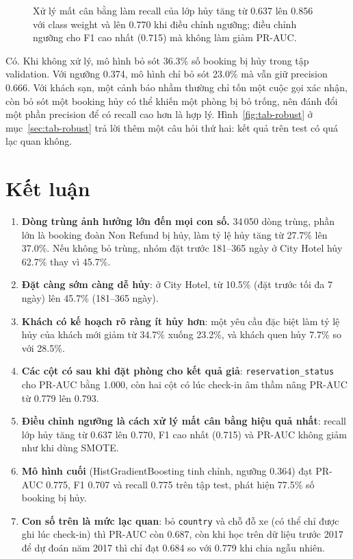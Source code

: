 \begin{figure}[H]
\centering
{}
\caption{Xử lý mất cân bằng làm recall của lớp hủy tăng từ 0.637 lên 0.856 với class weight và lên 0.770 khi điều chỉnh ngưỡng; điều chỉnh ngưỡng cho F1 cao nhất (0.715) mà không làm giảm PR-AUC.}
\label{fig:tab-creative}
\end{figure}

Có. Khi không xử lý, mô hình bỏ sót 36.3\% số booking bị hủy trong tập validation. Với ngưỡng 0.374, mô hình chỉ bỏ sót 23.0\%
mà vẫn giữ precision 0.666. Với khách sạn, một cảnh báo nhầm thường chỉ tốn một cuộc gọi xác nhận, còn bỏ sót một booking hủy
có thể khiến một phòng bị bỏ trống, nên đánh đổi một phần precision để có recall cao hơn là hợp lý.
Hình~\ref{fig:tab-robust} ở mục~\ref{sec:tab-robust} trả lời thêm một câu hỏi thứ hai: kết quả trên test có quá lạc quan không.

\section{Kết luận}
\begin{enumerate}[leftmargin=1.5cm]
    \item \textbf{Dòng trùng ảnh hưởng lớn đến mọi con số.} 34\,050 dòng trùng, phần lớn là booking đoàn Non Refund bị hủy,
          làm tỷ lệ hủy tăng từ 27.7\% lên 37.0\%. Nếu không bỏ trùng, nhóm đặt trước 181--365 ngày ở City Hotel hủy 62.7\% thay vì 45.7\%.
    \item \textbf{Đặt càng sớm càng dễ hủy}: ở City Hotel, từ 10.5\% (đặt trước tối đa 7 ngày) lên 45.7\% (181--365 ngày).
    \item \textbf{Khách có kế hoạch rõ ràng ít hủy hơn}: một yêu cầu đặc biệt làm tỷ lệ hủy của khách mới giảm từ 34.7\% xuống 23.2\%,
          và khách quen hủy 7.7\% so với 28.5\%.
    \item \textbf{Các cột có sau khi đặt phòng cho kết quả giả}: \texttt{reservation\_status} cho PR-AUC bằng 1.000,
          còn hai cột có lúc check-in âm thầm nâng PR-AUC từ 0.779 lên 0.793.
    \item \textbf{Điều chỉnh ngưỡng là cách xử lý mất cân bằng hiệu quả nhất}: recall lớp hủy tăng từ 0.637 lên 0.770,
          F1 cao nhất (0.715) và PR-AUC không giảm như khi dùng SMOTE.
    \item \textbf{Mô hình cuối} (HistGradientBoosting tinh chỉnh, ngưỡng 0.364) đạt PR-AUC 0.775, F1 0.707 và recall 0.775 trên tập test,
          phát hiện 77.5\% số booking bị hủy.
    \item \textbf{Con số trên là mức lạc quan}: bỏ \texttt{country} và chỗ đỗ xe (có thể chỉ được ghi lúc check-in) thì PR-AUC còn 0.687,
          còn khi học trên dữ liệu trước 2017 để dự đoán năm 2017 thì chỉ đạt 0.684 so với 0.779 khi chia ngẫu nhiên.
\end{enumerate}


